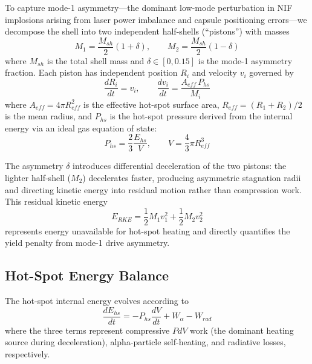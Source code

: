 \documentclass[conference]{IEEEtran}
\begin{document}
To capture mode-1 asymmetry---the dominant low-mode perturbation in NIF implosions arising from laser power imbalance and capsule positioning errors---we decompose the shell into two independent half-shells (``pistons'') with masses
\begin{equation}
M_1 = \frac{M_{sh}}{2}(1 + \delta), \qquad M_2 = \frac{M_{sh}}{2}(1 - \delta)
\label{eq:masses}
\end{equation}
where $M_{sh}$ is the total shell mass and $\delta \in [0, 0.15]$ is the mode-1 asymmetry fraction.  Each piston has independent position $R_i$ and velocity $v_i$ governed by
\begin{equation}
\frac{dR_i}{dt} = v_i, \qquad \frac{dv_i}{dt} = \frac{A_{eff} \, P_{hs}}{M_i}
\label{eq:piston}
\end{equation}
where $A_{eff} = 4\pi R_{eff}^2$ is the effective hot-spot surface area, $R_{eff} = (R_1 + R_2)/2$ is the mean radius, and $P_{hs}$ is the hot-spot pressure derived from the internal energy via an ideal gas equation of state:
\begin{equation}
P_{hs} = \frac{2}{3} \frac{E_{hs}}{V}, \qquad V = \frac{4}{3}\pi R_{eff}^3
\label{eq:pressure}
\end{equation}

The asymmetry $\delta$ introduces differential deceleration of the two pistons: the lighter half-shell ($M_2$) decelerates faster, producing asymmetric stagnation radii and directing kinetic energy into residual motion rather than compression work.  This residual kinetic energy
\begin{equation}
E_{RKE} = \frac{1}{2}M_1 v_1^2 + \frac{1}{2}M_2 v_2^2
\label{eq:rke}
\end{equation}
represents energy unavailable for hot-spot heating and directly quantifies the yield penalty from mode-1 drive asymmetry.

\subsection{Hot-Spot Energy Balance}

The hot-spot internal energy evolves according to
\begin{equation}
\frac{dE_{hs}}{dt} = -P_{hs}\frac{dV}{dt} + W_\alpha - W_{rad}
\label{eq:energy}
\end{equation}
where the three terms represent compressive $PdV$ work (the dominant heating source during deceleration), alpha-particle self-heating, and radiative losses, respectively.
\end{document}
